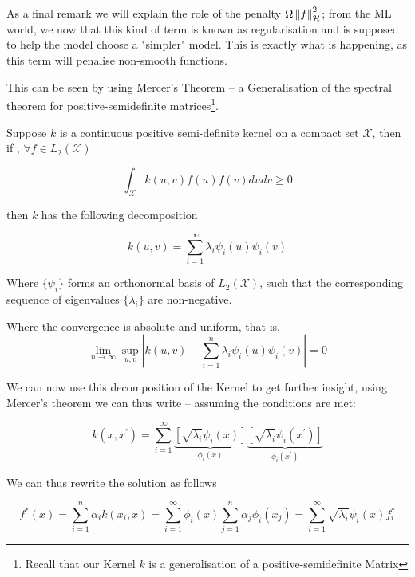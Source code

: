As a final remark we will explain the role of the penalty $\Omega \left\lVert f\right\rVert_{\mathcal{H}}^{2}$; from 
the ML world, we now that this kind of term is known as regularisation and is supposed to help the model 
choose a "simpler" model. This is exactly what is happening, as this term will penalise non-smooth functions.

This can be seen by using Mercer's Theorem -- a Generalisation of the spectral theorem for positive-semidefinite
matrices\footnote{Recall that our Kernel $k$ is a generalisation of a positive-semidefinite Matrix}.

\begin{theorem}[Mercer's] 

Suppose $k$ is a continuous positive semi-definite kernel on a compact set $\mathcal{X}$, then if
, $\forall f \in L_{2}(\mathcal{X})$

\[
\int_{\mathcal{X}} k(u, v) f(u) f(v) d u d v \geq 0
\]

then $k$ has the following decomposition

\begin{equation}
    k(u, v)=\sum_{i=1}^{\infty} \lambda_{i} \psi_{i}(u) \psi_{i}(v)
\end{equation}

Where $\{\psi_i\}$ forms an orthonormal basis of $L_2(\mathcal{X})$, 
such that the corresponding sequence of eigenvalues $\{\lambda_i\}$ are non-negative.

Where the convergence is absolute and uniform, that is,
\[
\lim _{n \rightarrow \infty} \sup _{u, v}\left|k(u, v)-\sum_{i=1}^{n} \lambda_{i} \psi_{i}(u) \psi_{i}(v)\right|=0
\]
    
\end{theorem}

We can now use this decomposition of the Kernel to get further insight, using Mercer's theorem we can 
thus write -- assuming the conditions are met:

$$
    k \left(x, x^{\prime}\right)=\sum_{i=1}^{\infty} 
    \underbrace{\left[\sqrt{\lambda_{i}} \psi_{i}(x)\right]}_{\phi_{i}(x)} 
    \underbrace{\left[\sqrt{\lambda_{i}} \psi_{i}\left(x^{\prime}\right)\right]}_{\phi_{i}\left(x^{\prime}\right)}
$$

We can thus rewrite the solution as follows

$$
    f^{*}(x) = \sum_{i=1}^{n} \alpha_{i} k\left(x_i, x\right) = 
    \sum_{i=1}^{\infty} \phi_i\left(x\right) 
    \sum_{j=1}^{n} \alpha_{j}  \phi_i\left(x_j\right) = 
    \sum_{i=1}^{\infty} \sqrt{\lambda_{i}} \psi_{i}(x) f^{*}_i 
$$

